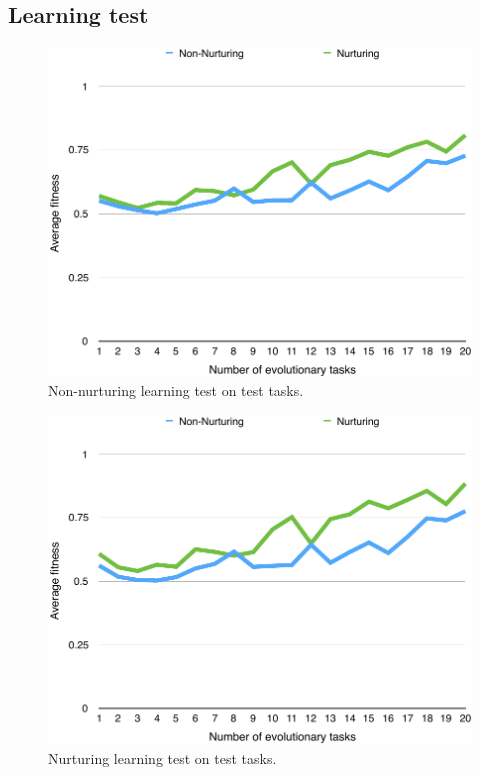 \documentclass[master]{outhesis}
\begin{document}
\subsection{Learning test}

\begin{figure}[H]
	\centering
	\includegraphics{NonNurturingLearningTestPlot.pdf}
	\caption{Non-nurturing learning test on test tasks.}
\end{figure}

\begin{figure}[H]
	\centering
	\includegraphics{NurturingLearningTestPlot.pdf}
	\caption{Nurturing learning test on test tasks.}
\end{figure}

\makebackmatter
\end{document}
